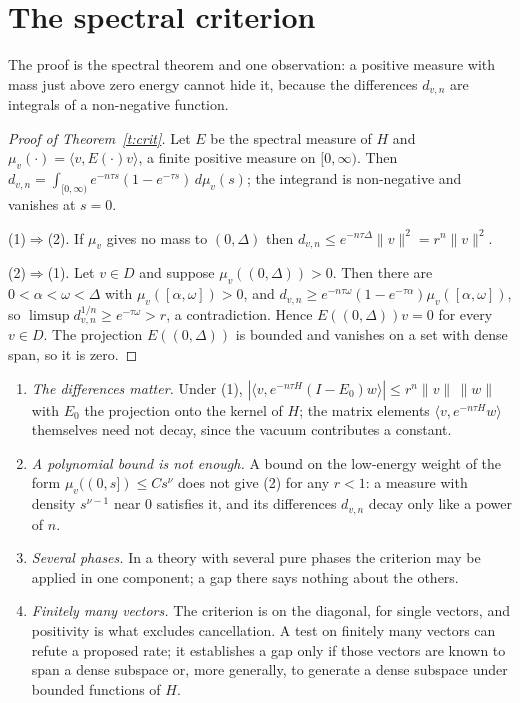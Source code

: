 \section{The spectral criterion}\label{s:crit}
The proof is the spectral theorem and one observation: a positive measure with mass just above zero energy
cannot hide it, because the differences $d_{v,n}$ are integrals of a non-negative function.

\begin{proof}[Proof of Theorem~\ref{t:crit}]
Let $E$ be the spectral measure of $H$ and $\mu_v(\cdot)=\langle v,E(\cdot)v\rangle$, a finite positive measure
on $[0,\infty)$. Then $d_{v,n}=\int_{[0,\infty)}e^{-n\tau s}(1-e^{-\tau s})\,d\mu_v(s)$; the integrand is
non-negative and vanishes at $s=0$.

(1)$\Rightarrow$(2). If $\mu_v$ gives no mass to $(0,\Delta)$ then $d_{v,n}\le e^{-n\tau\Delta}\|v\|^2=r^n\|v\|^2$.

(2)$\Rightarrow$(1). Let $v\in D$ and suppose $\mu_v((0,\Delta))>0$. Then there are $0<\alpha<\omega<\Delta$ with
$\mu_v([\alpha,\omega])>0$, and $d_{v,n}\ge e^{-n\tau\omega}(1-e^{-\tau\alpha})\mu_v([\alpha,\omega])$, so
$\limsup d_{v,n}^{1/n}\ge e^{-\tau\omega}>r$, a contradiction. Hence $E((0,\Delta))v=0$ for every $v\in D$.
The projection $E((0,\Delta))$ is bounded and vanishes on a set with dense span, so it is zero.
\end{proof}

\begin{remark}\label{r:crit}
\leavevmode
\begin{enumerate}
\item[(a)] \emph{The differences matter.} Under (1), $|\langle v,e^{-n\tau H}(I-E_0)w\rangle|\le r^n\|v\|\,\|w\|$ with $E_0$ the
projection onto the kernel of $H$; the matrix elements $\langle v,e^{-n\tau H}w\rangle$ themselves need not decay,
since the vacuum contributes a constant.
\item[(b)] \emph{A polynomial bound is not enough.} A bound on the low-energy weight of the form
$\mu_v((0,s])\le Cs^\nu$ does not give (2) for any $r<1$: a measure with density $s^{\nu-1}$ near $0$
satisfies it, and its differences $d_{v,n}$ decay only like a power of $n$.
\item[(c)] \emph{Several phases.} In a theory with several pure phases the criterion may be applied in one
component; a gap there says nothing about the others.
\item[(d)] \emph{Finitely many vectors.} The criterion is on the diagonal, for single vectors, and
positivity is what excludes cancellation. A test on finitely many vectors can refute a proposed rate; it
establishes a gap only if those vectors are known to span a dense subspace or, more generally, to generate
a dense subspace under bounded functions of $H$.
\end{enumerate}
\end{remark}

